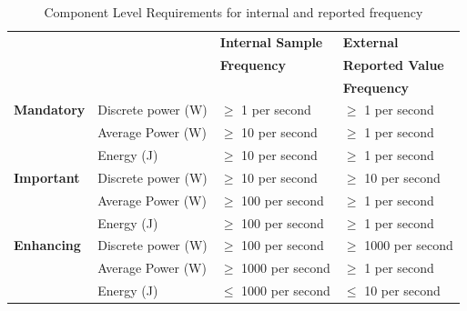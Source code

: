\begin{table}[htbp]
\caption{Component Level Requirements for internal and reported frequency}
\label{tab:comlevel}
\begin{tabular}{|p{3.0cm}|p{3.5cm}|p{3.5cm}|p{3.5cm}|} \hline
& & \textbf{Internal Sample}&\textbf{External}\\ 
& & \textbf{Frequency}&\textbf{Reported Value}\\ 
& & & \textbf{Frequency}\\ \hline

\textbf{Mandatory} &
Discrete power (W)&
\mbox{$ \ge $} 1 per second &
\mbox{$ \ge $} 1 per second \\

& 
Average Power (W) &
\mbox{$ \ge $} 10 per second &
\mbox{$ \ge $} 1 per second \\

& 
Energy (J) &
\mbox{$ \ge $} 10 per second &
\mbox{$ \ge $} 1 per second \\ \hline

\textbf{Important} & 
Discrete power (W)&
\mbox{$ \ge $} 10 per second &
\mbox{$ \ge $} 10 per second \\

& 
Average Power (W) &
\mbox{$ \ge $} 100 per second &
\mbox{$ \ge $} 1 per second \\

& 
Energy (J) &
\mbox{$ \ge $} 100 per second &
\mbox{$ \ge $} 1 per second \\ \hline 

\textbf{Enhancing} & 
Discrete power (W)&
\mbox{$ \ge $} 100 per second &
\mbox{$ \ge $} 1000 per second \\

& 
Average Power (W) &
\mbox{$ \ge $} 1000 per second &
\mbox{$ \ge $} 1 per second \\

& 
Energy (J) &
\mbox{$ \le $} 1000 per second &
\mbox{$ \le $} 10 per second \\ \hline

\end{tabular}
\end{table}
